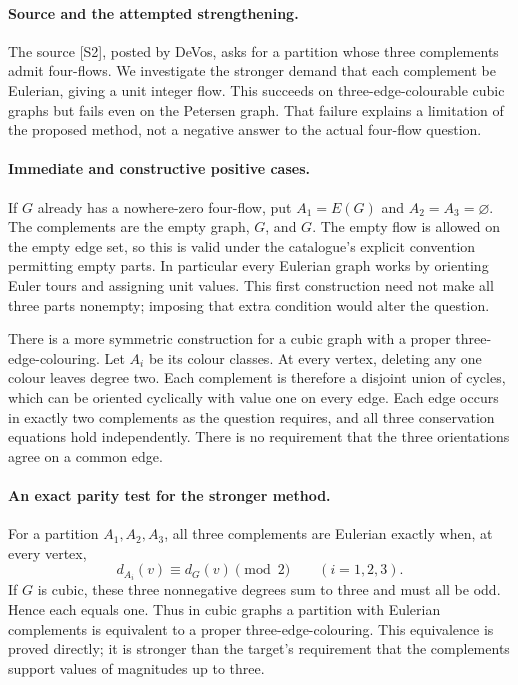 \documentclass[11pt,a4paper]{article}
\begin{document}
\paragraph{Source and the attempted strengthening.}
The source [S2], posted by DeVos, asks for a partition whose three
complements admit four-flows. We investigate the stronger demand that
each complement be Eulerian, giving a unit integer flow. This succeeds
on three-edge-colourable cubic graphs but fails even on the Petersen
graph. That failure explains a limitation of the proposed method, not
a negative answer to the actual four-flow question.

\paragraph{Immediate and constructive positive cases.}
If $G$ already has a nowhere-zero four-flow, put $A_1=E(G)$ and
$A_2=A_3=\varnothing$. The complements are the empty graph, $G$, and $G$.
The empty flow is allowed on the empty edge set, so this is valid under
the catalogue's explicit convention permitting empty parts.
In particular every Eulerian graph works by orienting Euler tours and
assigning unit values. This first construction need not make all three
parts nonempty; imposing that extra condition would alter the question.

There is a more symmetric construction for a cubic graph with a proper
three-edge-colouring. Let $A_i$ be its colour classes. At every vertex,
deleting any one colour leaves degree two. Each complement is therefore
a disjoint union of cycles, which can be oriented cyclically with value
one on every edge. Each edge occurs in exactly two complements as the
question requires, and all three conservation equations hold independently.
There is no requirement that the three orientations agree on a common edge.

\paragraph{An exact parity test for the stronger method.}
For a partition $A_1,A_2,A_3$, all three complements are Eulerian exactly
when, at every vertex,
\[
       d_{A_i}(v)\equiv d_G(v)\pmod2\qquad(i=1,2,3).
\]
If $G$ is cubic, these three nonnegative degrees sum to three and must
all be odd. Hence each equals one. Thus in cubic graphs a partition
with Eulerian complements is equivalent to a proper three-edge-colouring.
This equivalence is proved directly; it is stronger than the target's
requirement that the complements support values of magnitudes up to three.
\end{document}
